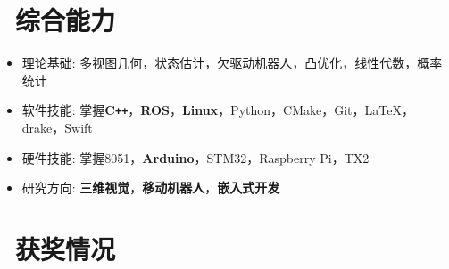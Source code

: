 \documentclass{resume}
\begin{document}
\section{\faCogs\ 综合能力}
\begin{itemize}[parsep=0.5ex]
  \item 理论基础: 多视图几何，状态估计，欠驱动机器人，凸优化，线性代数，概率统计
  \item 软件技能: 掌握\textbf{C\texttt{++}}，\textbf{ROS}，\textbf{Linux}，Python，CMake，Git，\LaTeX，drake，Swift
  \item 硬件技能: 掌握8051，\textbf{Arduino}，STM32，Raspberry Pi，TX2
  \item 研究方向: \textbf{三维视觉}，\textbf{移动机器人}，\textbf{嵌入式开发}
\end{itemize}

\section{\faHeartO\ 获奖情况}
\end{document}
